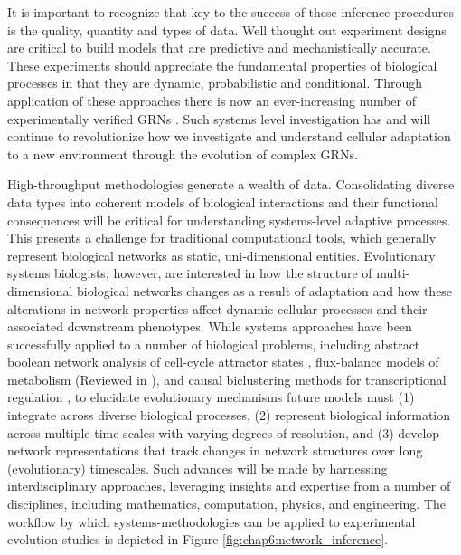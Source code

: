 It is important to recognize that key to the success of these inference procedures is the quality, quantity and types of data.  Well thought out experiment designs are critical to build models that are predictive and mechanistically accurate.  These experiments should appreciate the fundamental properties of biological processes in that they are dynamic, probabilistic and conditional. Through application of these approaches there is now an ever-increasing number of experimentally verified GRNs \cite{de_smet_advantages_2010}. Such systems level investigation has and will continue to revolutionize how we investigate and understand cellular adaptation to a new environment through the evolution of complex GRNs.

High-throughput methodologies generate a wealth of data. Consolidating diverse data types into coherent models of biological interactions and their functional consequences will be critical for understanding systems-level adaptive processes. This presents a challenge for traditional computational tools, which generally represent biological networks as static, uni-dimensional entities. Evolutionary systems biologists, however, are interested in how the structure of multi-dimensional biological networks changes as a result of adaptation and how these alterations in network properties affect dynamic cellular processes and their associated downstream phenotypes. While systems approaches have been successfully applied to a number of biological problems, including abstract boolean network analysis of cell-cycle attractor states \cite{li_yeast_2004}, flux-balance models of metabolism (Reviewed in \cite{kauffman_advances_2003}), and causal biclustering methods for transcriptional regulation \cite{bonneau_predictive_2007}, to elucidate evolutionary mechanisms future models must (1) integrate across diverse biological processes, (2) represent biological information across multiple time scales with varying degrees of resolution, and (3) develop network representations that track changes in network structures over long (evolutionary) timescales. Such advances will be made by harnessing interdisciplinary approaches, leveraging insights and expertise from a number of disciplines, including mathematics, computation, physics, and engineering. The workflow by which systems-methodologies can be applied to experimental evolution studies is depicted in Figure \ref{fig:chap6:network_inference}.

